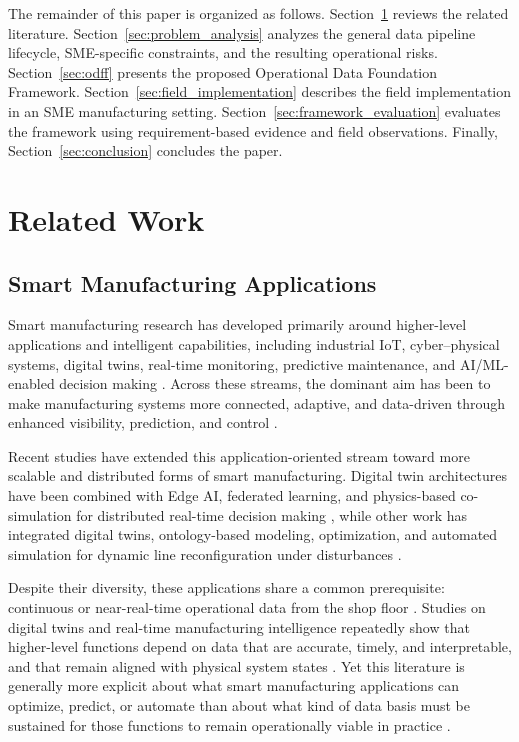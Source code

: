 \documentclass[systems,article,submit,pdftex,moreauthors]{Definitions/mdpi}
\begin{document}
The remainder of this paper is organized as follows. Section~\ref{sec:related_work} reviews the related literature. Section~\ref{sec:problem_analysis} analyzes the general data pipeline lifecycle, SME-specific constraints, and the resulting operational risks. Section~\ref{sec:odff} presents the proposed Operational Data Foundation Framework. Section~\ref{sec:field_implementation} describes the field implementation in an SME manufacturing setting. Section~\ref{sec:framework_evaluation} evaluates the framework using requirement-based evidence and field observations. Finally, Section~\ref{sec:conclusion} concludes the paper.


\section{Related Work}
\label{sec:related_work}

\subsection{Smart Manufacturing Applications}
\label{sec:smart_manufacturing_applications}

Smart manufacturing research has developed primarily around higher-level applications and intelligent capabilities, including industrial IoT, cyber--physical systems, digital twins, real-time monitoring, predictive maintenance, and AI/ML-enabled decision making \cite{rozhok2026advanced, bueno2020smart, cinar2020digital, atalay2022digital}. Across these streams, the dominant aim has been to make manufacturing systems more connected, adaptive, and data-driven through enhanced visibility, prediction, and control \cite{rozhok2026advanced, bueno2020smart, song2025smart}.

Recent studies have extended this application-oriented stream toward more scalable and distributed forms of smart manufacturing. Digital twin architectures have been combined with Edge AI, federated learning, and physics-based co-simulation for distributed real-time decision making \cite{padmavathi2025digital}, while other work has integrated digital twins, ontology-based modeling, optimization, and automated simulation for dynamic line reconfiguration under disturbances \cite{fu2025digital}.

Despite their diversity, these applications share a common prerequisite: continuous or near-real-time operational data from the shop floor \cite{nguyen2025aidriven, tao2017digital, ding2019digital}. Studies on digital twins and real-time manufacturing intelligence repeatedly show that higher-level functions depend on data that are accurate, timely, and interpretable, and that remain aligned with physical system states \cite{nguyen2025aidriven, ojstersek2023optimizing, qamsane2019digital}. Yet this literature is generally more explicit about what smart manufacturing applications can optimize, predict, or automate than about what kind of data basis must be sustained for those functions to remain operationally viable in practice \cite{rozhok2026advanced, ciano2021digital, nguyen2025aidriven}.
\end{document}
